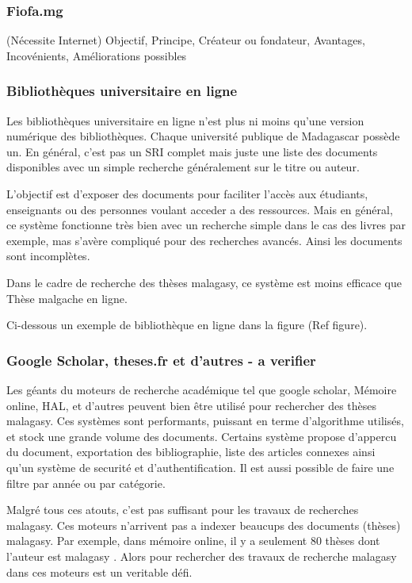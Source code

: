 \subsubsection{Fiofa.mg}
(Nécessite Internet)
Objectif, Principe, Créateur ou fondateur, Avantages, Incovénients, Améliorations possibles

\subsubsection{Bibliothèques universitaire en ligne}
Les bibliothèques universitaire en ligne n'est plus ni moins qu'une version numérique des bibliothèques. Chaque université publique de Madagascar possède un. En général, c'est pas un SRI complet mais juste une liste des documents disponibles avec un simple recherche généralement sur le titre ou auteur. 

L'objectif est d'exposer des documents pour faciliter l'accès aux étudiants, enseignants ou des personnes voulant acceder a des ressources. Mais en général, ce système fonctionne très bien avec un recherche simple dans le cas des livres par exemple, mas s'avère compliqué pour des recherches avancés. Ainsi les documents sont incomplètes. 

Dans le cadre de recherche des thèses malagasy, ce système est moins efficace que Thèse malgache en ligne.

Ci-dessous un exemple de bibliothèque en ligne dans la figure (Ref figure).

\subsubsection{Google Scholar, theses.fr et d'autres - a verifier}
Les géants du moteurs de recherche académique tel que google scholar, Mémoire online, HAL, et d'autres peuvent bien être utilisé pour rechercher des thèses malagasy. Ces systèmes sont performants, puissant en terme d'algorithme utilisés, et stock une grande volume des documents. Certains système propose d'appercu du document, exportation des bibliographie, liste des articles connexes ainsi qu'un système de securité et d'authentification. Il est aussi possible de faire une filtre par année ou par catégorie.

Malgré tous ces atouts, c'est pas suffisant pour les travaux de recherches malagasy. Ces moteurs n'arrivent pas a indexer beaucups des documents (thèses) malagasy. Par exemple, dans mémoire online, il y a seulement 80 thèses dont l'auteur est malagasy \citep{memoire-online}. Alors pour rechercher des travaux de recherche malagasy dans ces moteurs est un veritable défi.

